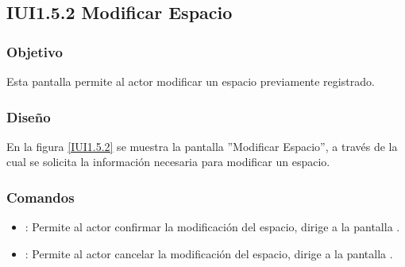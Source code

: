 \subsection{IUI1.5.2 Modificar Espacio}

\subsubsection{Objetivo}
	Esta pantalla permite al actor modificar un espacio previamente registrado.

\subsubsection{Diseño}

	En la figura \ref{IUI1.5.2} se muestra la pantalla ''Modificar Espacio'', a través de la cual se solicita la información necesaria para modificar un espacio.


\subsubsection{Comandos}
\begin{itemize}
	\item {}: Permite al actor confirmar la modificación del espacio, dirige a la pantalla .
	
	\item {}: Permite al actor cancelar la modificación del espacio, dirige a la pantalla .
\end{itemize}
